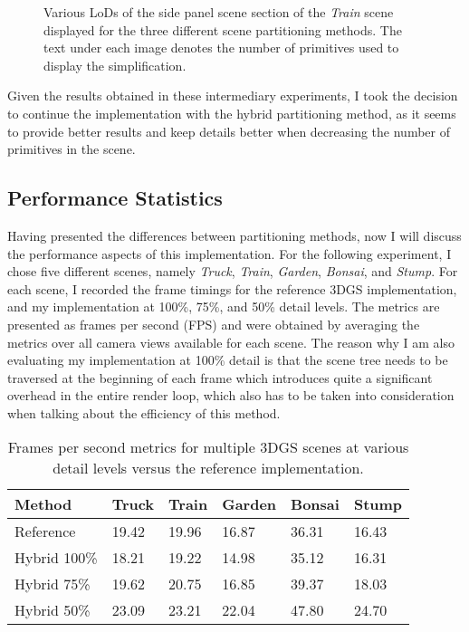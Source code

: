 \begin{figure}[H]
    \centering
    
    \caption{Various LoDs of the side panel scene section of the \textit{Train} scene displayed for the three different scene partitioning methods. The text under each image denotes the number of primitives used to display the simplification.}
    \label{fig:panellod}
\end{figure}

Given the results obtained in these intermediary experiments, I took the decision to continue the implementation with the hybrid partitioning method, as it seems to provide better results and keep details better when decreasing the number of primitives in the scene.

\subsection{Performance Statistics}
Having presented the differences between partitioning methods, now I will discuss the performance aspects of this implementation. For the following experiment, I chose five different scenes, namely \textit{Truck}, \textit{Train}, \textit{Garden}, \textit{Bonsai}, and \textit{Stump}. For each scene, I recorded the frame timings for the reference 3DGS implementation, and my implementation at 100\%, 75\%, and 50\% detail levels. The metrics are presented as frames per second (FPS) and were obtained by averaging the metrics over all camera views available for each scene. The reason why I am also evaluating my implementation at 100\% detail is that the scene tree needs to be traversed at the beginning of each frame which introduces quite a significant overhead in the entire render loop, which also has to be taken into consideration when talking about the efficiency of this method. 

\begin{table}[H]
\centering
\begin{tabular}{l|lllll}
Method       & Truck & Train & Garden & Bonsai & Stump \\ \hline
Reference    & 19.42 & 19.96 & 16.87  & 36.31  & 16.43 \\ \hline
Hybrid 100\% & 18.21 & 19.22 & 14.98  & 35.12  & 16.31 \\ \hline
Hybrid 75\%  & 19.62 & 20.75 & 16.85  & 39.37  & 18.03 \\ \hline
Hybrid 50\%  & 23.09 & 23.21 & 22.04  & 47.80  & 24.70
\end{tabular}
\caption{Frames per second metrics for multiple 3DGS scenes at various detail levels versus the reference implementation.}
\label{tab:fpsmetrics}
\end{table}

